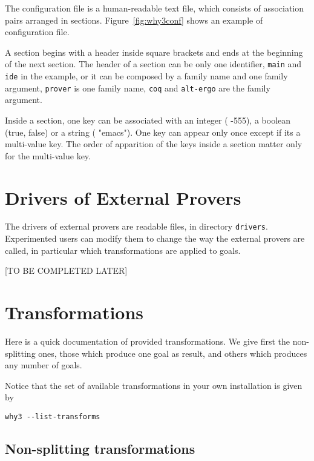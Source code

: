 The configuration file is a human-readable text file, which consists
of association pairs arranged in sections. Figure~\ref{fig:why3conf}
shows an example of configuration file.

A section begins with a header inside square brackets and ends at the
beginning of the next section. The header of a
section can be only one identifier, \texttt{main} and \texttt{ide} in
the example, or it can be composed by a family name and one family
argument, \texttt{prover} is one family name, \texttt{coq} and
\texttt{alt-ergo} are the family argument.

Inside a section, one key can be associated with an integer (\eg{} -555),
a boolean (true, false) or a string (\eg{} "emacs"). One key can appear
only once except if its a multi-value key. The order of apparition of
the keys inside a section matter only for the multi-value key.

\section{Drivers of External Provers}
\label{sec:drivers}

The drivers of external provers are readable files, in directory
\texttt{drivers}. Experimented users can modify them to change the way
the external provers are called, in particular which transformations
are applied to goals.

[TO BE COMPLETED LATER]

\section{Transformations}
\label{sec:transformations}

Here is a quick documentation of provided transformations. We give
first the non-splitting ones, \eg{} those which produce one goal as
result, and others which produces any number of goals.

Notice that the set of available transformations in your own
installation is given by
\begin{verbatim}
why3 --list-transforms
\end{verbatim}

\subsection{Non-splitting transformations}


